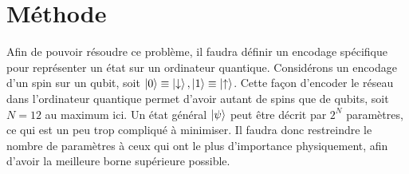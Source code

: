 \documentclass[../main.tex]{subfiles}
\begin{document}
    \section{Méthode} %
    \label{sec:Méthode}
    Afin de pouvoir résoudre ce problème, il faudra définir un encodage
    spécifique pour représenter un état sur un ordinateur quantique.
    Considérons un encodage d'un spin sur un qubit, soit $\ket{0}\equiv
    \ket{\downarrow}, \ket{1}\equiv\ket{\uparrow}$. Cette façon d'encoder le
    réseau dans l'ordinateur quantique permet d'avoir autant de spins que de
    qubits, soit $N=12$ au maximum ici. Un état général $\ket{\psi}$ peut être
    décrit par $2^N$ paramètres, ce qui est un peu trop compliqué à minimiser.
    Il faudra donc restreindre le nombre de paramètres à ceux qui ont le plus
    d'importance physiquement, afin d'avoir la meilleure borne supérieure possible.
\end{document}
